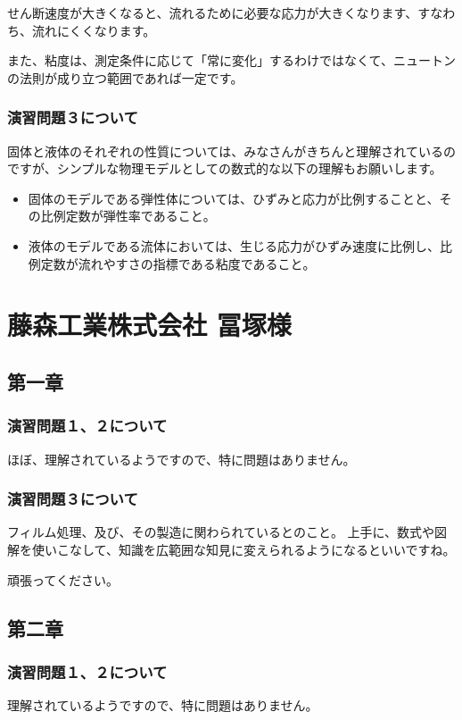 \documentclass[uplatex,dvipdfmx,a4paper,11pt]{jsreport}
\begin{document}
せん断速度が大きくなると、流れるために必要な応力が大きくなります、すなわち、流れにくくなります。

また、粘度は、測定条件に応じて「常に変化」するわけではなくて、ニュートンの法則が成り立つ範囲であれば一定です。

\subsubsection*{演習問題３について}

固体と液体のそれぞれの性質については、みなさんがきちんと理解されているのですが、シンプルな物理モデルとしての数式的な以下の理解もお願いします。
\begin{itemize}
    \item 固体のモデルである弾性体については、ひずみと応力が比例することと、その比例定数が弾性率であること。
    \item 液体のモデルである流体においては、生じる応力がひずみ速度に比例し、比例定数が流れやすさの指標である粘度であること。
\end{itemize}

\clearpage

\section*{藤森工業株式会社 冨塚様}
\subsection*{第一章}
\subsubsection*{演習問題１、２について}
ほぼ、理解されているようですので、特に問題はありません。

\subsubsection*{演習問題３について}

フィルム処理、及び、その製造に関わられているとのこと。
上手に、数式や図解を使いこなして、知識を広範囲な知見に変えられるようになるといいですね。

頑張ってください。

\subsection*{第二章}
\subsubsection*{演習問題１、２について}
理解されているようですので、特に問題はありません。
\end{document}
